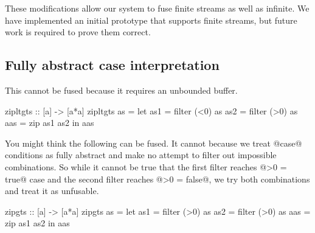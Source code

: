 These modifications allow our system to fuse finite streams as well as infinite.
We have implemented an initial prototype that supports finite streams, but future work is required to prove them correct.

\subsection{Fully abstract case interpretation}

This cannot be fused because it requires an unbounded buffer.
\begin{code}
zipltgts :: [a] -> [a*a]
zipltgts as =
  let as1 = filter (<0) as
      as2 = filter (>0) as
      aas = zip as1 as2
  in  aas
\end{code}

You might think the following can be fused.
It cannot because we treat @case@ conditions as fully abstract and make no attempt to filter out impossible combinations.
So while it cannot be true that the first filter reaches @>0 = true@ case and the second filter reaches @>0 = false@, we try both combinations and treat it as unfusable.
\begin{code}
zipgts :: [a] -> [a*a]
zipgts as =
  let as1 = filter (>0) as
      as2 = filter (>0) as
      aas = zip as1 as2
  in  aas
\end{code}

